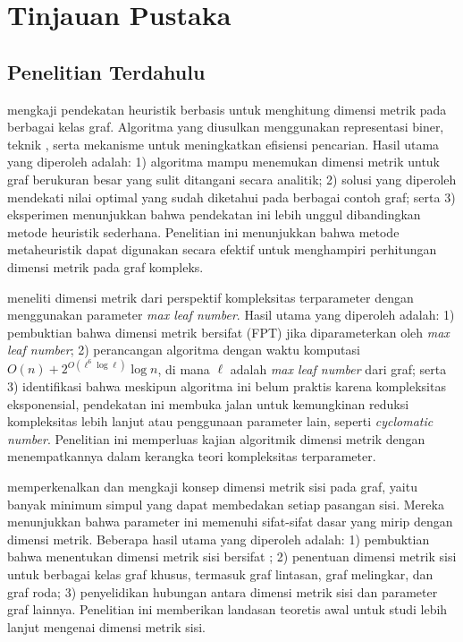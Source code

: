 \chapter{Tinjauan Pustaka}

\section{Penelitian Terdahulu}

\cite{kratica2007} mengkaji pendekatan heuristik berbasis  untuk menghitung dimensi metrik pada berbagai kelas graf. Algoritma yang diusulkan menggunakan representasi biner, teknik , serta mekanisme  untuk meningkatkan efisiensi pencarian. Hasil utama yang diperoleh adalah: 1) algoritma mampu menemukan dimensi metrik untuk graf berukuran besar yang sulit ditangani secara analitik; 2) solusi yang diperoleh mendekati nilai optimal yang sudah diketahui pada berbagai contoh graf; serta 3) eksperimen menunjukkan bahwa pendekatan ini lebih unggul dibandingkan metode heuristik sederhana. Penelitian ini menunjukkan bahwa metode metaheuristik dapat digunakan secara efektif untuk menghampiri perhitungan dimensi metrik pada graf kompleks.

\cite{eppstein2015} meneliti dimensi metrik dari perspektif kompleksitas terparameter dengan menggunakan parameter \emph{max leaf number}. Hasil utama yang diperoleh adalah: 1) pembuktian bahwa dimensi metrik bersifat  (FPT) jika diparameterkan oleh \emph{max leaf number}; 2) perancangan algoritma dengan waktu komputasi \(O(n) + 2^{O(\ell^{6} \log \ell)} \log n\), di mana \(\ell\) adalah \emph{max leaf number} dari graf; serta 3) identifikasi bahwa meskipun algoritma ini belum praktis karena kompleksitas eksponensial, pendekatan ini membuka jalan untuk kemungkinan reduksi kompleksitas lebih lanjut atau penggunaan parameter lain, seperti \emph{cyclomatic number}. Penelitian ini memperluas kajian algoritmik dimensi metrik dengan menempatkannya dalam kerangka teori kompleksitas terparameter.

\cite{kelenc2018} memperkenalkan dan mengkaji konsep dimensi metrik sisi pada graf, yaitu banyak minimum simpul yang dapat membedakan setiap pasangan sisi. Mereka menunjukkan bahwa parameter ini memenuhi sifat-sifat dasar yang mirip dengan dimensi metrik. Beberapa hasil utama yang diperoleh adalah: 1) pembuktian bahwa menentukan dimensi metrik sisi bersifat ; 2) penentuan dimensi metrik sisi untuk berbagai kelas graf khusus, termasuk graf lintasan, graf melingkar, dan graf roda; 3) penyelidikan hubungan antara dimensi metrik sisi dan parameter graf lainnya. Penelitian ini memberikan landasan teoretis awal untuk studi lebih lanjut mengenai dimensi metrik sisi.


